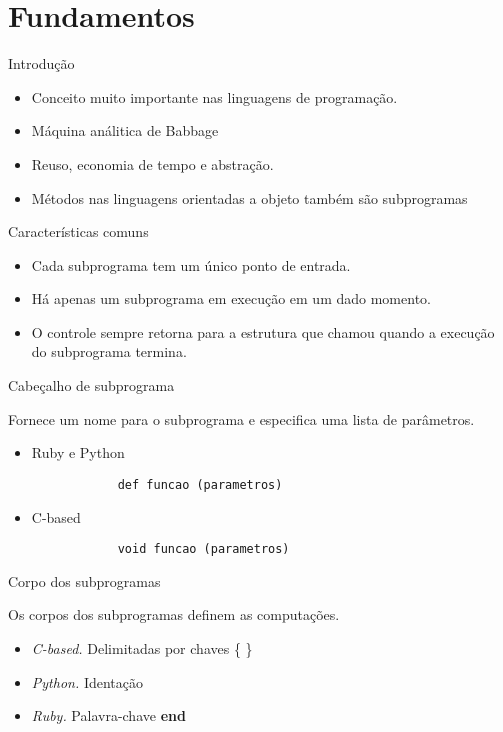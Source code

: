 
\section{Fundamentos} %
\label{sec:introducao}

\begin{frame}{Introdução}
	\begin{itemize}
	  \item Conceito muito importante nas linguagens de programação.
	  \item Máquina análitica de Babbage
	  \item Reuso, economia de tempo e abstração.
	  \item Métodos nas linguagens orientadas a objeto também são subprogramas
	\end{itemize}
\end{frame}

\begin{frame}{Características comuns}
	\begin{itemize}
		\item Cada subprograma tem um único ponto de entrada.
		\item Há apenas um subprograma em execução em um dado momento.
		\item O controle sempre retorna para a estrutura que chamou quando a execução do subprograma termina.
	\end{itemize}
\end{frame}

\begin{frame}[fragile]{Cabeçalho de subprograma}

	Fornece um nome para o subprograma e especifica uma lista de parâmetros.

	\begin{itemize}
		\item Ruby e Python
		\begin{verbatim}
			def funcao (parametros)
		\end{verbatim}

		\item C-based
		\begin{verbatim}
			void funcao (parametros)
		\end{verbatim}

	\end{itemize}
\end{frame}

\begin{frame}{Corpo dos subprogramas}

	Os corpos dos subprogramas definem as computações.

	\begin{itemize}
		\item \emph{C-based.} Delimitadas por chaves \{ \}
		\item \emph{Python.} Identação
		\item \emph{Ruby.} Palavra-chave \textbf{end}
	\end{itemize}

\end{frame}

